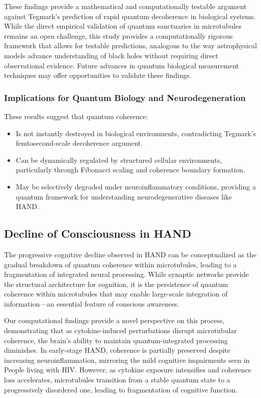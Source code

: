 These findings provide a mathematical and computationally testable argument against Tegmark's prediction of rapid quantum decoherence in biological systems. While the direct empirical validation of quantum sanctuaries in microtubules remains an open challenge, this study provides a computationally rigorous framework that allows for testable predictions, analogous to the way astrophysical models advance understanding of black holes without requiring direct observational evidence. Future advances in quantum biological measurement techniques may offer opportunities to validate these findings.

\subsubsection{Implications for Quantum Biology and Neurodegeneration}
These results suggest that quantum coherence:
\begin{itemize}
    \item Is not instantly destroyed in biological environments, contradicting Tegmark's femtosecond-scale decoherence argument.
    \item Can be dynamically regulated by structured cellular environments, particularly through Fibonacci scaling and coherence boundary formation.
    \item May be selectively degraded under neuroinflammatory conditions, providing a quantum framework for understanding neurodegenerative diseases like HAND.
\end{itemize}

\subsection{Decline of Consciousness in HAND}
The progressive cognitive decline observed in HAND can be conceptualized as the gradual breakdown of quantum coherence within microtubules, leading to a fragmentation of integrated neural processing. While synaptic networks provide the structural architecture for cognition, it is the persistence of quantum coherence within microtubules that may enable large-scale integration of information—an essential feature of conscious awareness. 

Our computational findings provide a novel perspective on this process, demonstrating that as cytokine-induced perturbations disrupt microtubular coherence, the brain's ability to maintain quantum-integrated processing diminishes. In early-stage HAND, coherence is partially preserved despite increasing neuroinflammation, mirroring the mild cognitive impairments seen in People living with HIV. However, as cytokine exposure intensifies and coherence loss accelerates, microtubules transition from a stable quantum state to a progressively disordered one, leading to fragmentation of cognitive function.

